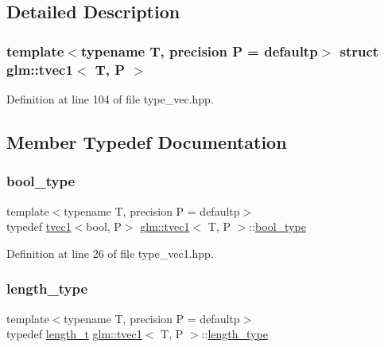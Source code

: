 \subsection{Detailed Description}
\subsubsection*{template$<$typename T, precision P = defaultp$>$\newline
struct glm\+::tvec1$<$ T, P $>$}



Definition at line 104 of file type\+\_\+vec.\+hpp.



\subsection{Member Typedef Documentation}
\mbox{\label{structglm_1_1tvec1_a0bb296cf2bfb6f0a8623528092e46b59}} 
\subsubsection{\texorpdfstring{bool\_type}{bool\_type}}
{\footnotesize\ttfamily template$<$typename T, precision P = defaultp$>$ \\
typedef \mbox{\hyperlink{structglm_1_1tvec1}{tvec1}}$<$bool, P$>$ \mbox{\hyperlink{structglm_1_1tvec1}{glm\+::tvec1}}$<$ T, P $>$\+::\mbox{\hyperlink{structglm_1_1tvec1_a0bb296cf2bfb6f0a8623528092e46b59}{bool\+\_\+type}}}



Definition at line 26 of file type\+\_\+vec1.\+hpp.

\mbox{\label{structglm_1_1tvec1_ae6254cf662020a8328b744b40f419527}} 
\subsubsection{\texorpdfstring{length\_type}{length\_type}}
{\footnotesize\ttfamily template$<$typename T, precision P = defaultp$>$ \\
typedef \mbox{\hyperlink{namespaceglm_a090a0de2260835bee80e71a702492ed9}{length\+\_\+t}} \mbox{\hyperlink{structglm_1_1tvec1}{glm\+::tvec1}}$<$ T, P $>$\+::\mbox{\hyperlink{structglm_1_1tvec1_ae6254cf662020a8328b744b40f419527}{length\+\_\+type}}}



